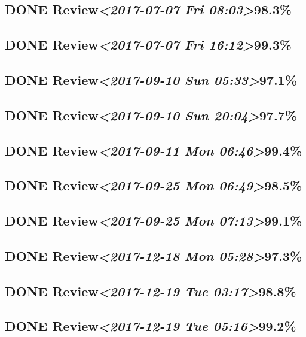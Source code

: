 \documentclass[11pt]{ctexart}
\begin{document}
\subsection{{\bfseries\sffamily DONE} Review\textit{<2017-07-07 Fri 08:03>}98.3\%}
\label{sec:org675540f}
\subsection{{\bfseries\sffamily DONE} Review\textit{<2017-07-07 Fri 16:12>}99.3\%}
\label{sec:org6df53fc}
\subsection{{\bfseries\sffamily DONE} Review\textit{<2017-09-10 Sun 05:33>}97.1\%}
\label{sec:org28b51bd}
\subsection{{\bfseries\sffamily DONE} Review\textit{<2017-09-10 Sun 20:04>}97.7\%}
\label{sec:orged7ed30}
\subsection{{\bfseries\sffamily DONE} Review\textit{<2017-09-11 Mon 06:46>}99.4\%}
\label{sec:orga095650}
\subsection{{\bfseries\sffamily DONE} Review\textit{<2017-09-25 Mon 06:49>}98.5\%}
\label{sec:orga8cc91c}
\subsection{{\bfseries\sffamily DONE} Review\textit{<2017-09-25 Mon 07:13>}99.1\%}
\label{sec:orge337652}

\subsection{{\bfseries\sffamily DONE} Review\textit{<2017-12-18 Mon 05:28>}97.3\%}
\label{sec:org749fe75}
\subsection{{\bfseries\sffamily DONE} Review\textit{<2017-12-19 Tue 03:17>}98.8\%}
\label{sec:orga45d5fc}
\subsection{{\bfseries\sffamily DONE} Review\textit{<2017-12-19 Tue 05:16>}99.2\%}
\label{sec:org5ded4f4}
\end{document}
